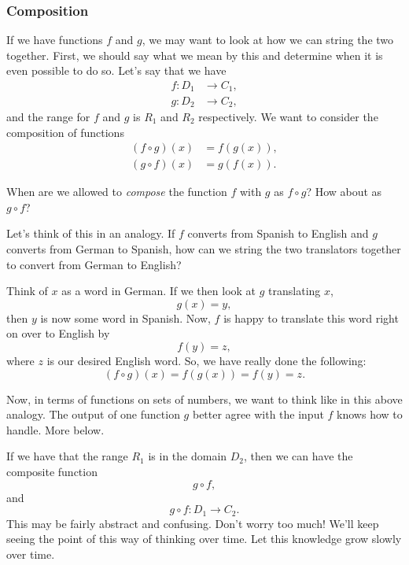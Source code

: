     
    \subsubsection{Composition}
    
    If we have functions $f$ and $g$, we may want to look at how we can string the two together.  First, we should say what we mean by this and determine when it is even possible to do so.  Let's say that we have
    \begin{align*}
        f\colon D_1 &\to C_1,\\
        g\colon D_2 &\to C_2,
    \end{align*}
    and the range for $f$ and $g$ is $R_1$ and $R_2$ respectively.  We want to consider the composition of functions
    \begin{align*}
        (f\circ g)(x) &= f(g(x)),\\
        (g\circ f)(x) &= g(f(x)).
    \end{align*}
    
    \begin{question}
    When are we allowed to \emph{compose} the function $f$ with $g$ as $f\circ g$? How about as $g\circ f$?
    \end{question}
    
    \begin{answer}
    Let's think of this in an analogy.  If $f$ converts from Spanish to English and $g$ converts from German to Spanish, how can we string the two translators together to convert from German to English?  
    
    Think of $x$ as a word in German.  If we then look at $g$ translating $x$,
    \[
    g(x)=y,
    \]
    then $y$ is now some word in Spanish.  Now, $f$ is happy to translate this word right on over to English by
    \[
    f(y)=z,
    \]
    where $z$ is our desired English word.  So, we have really done the following:
    \[
    (f\circ g)(x)=f(g(x))=f(y)=z.
    \]
    
    Now, in terms of functions on sets of numbers, we want to think like in this above analogy.  The output of one function $g$ better agree with the input $f$ knows how to handle.  More below.
    \end{answer}
    
    If we have that the range $R_1$ is in the domain $D_2$, then we can have the composite function
    \[
    g\circ f,
    \]
    and
    \[
    g\circ f \colon D_1 \to C_2.
    \]
    This may be fairly abstract and confusing.  Don't worry too much! We'll keep seeing the point of this way of thinking over time. Let this knowledge grow slowly over time.
    
